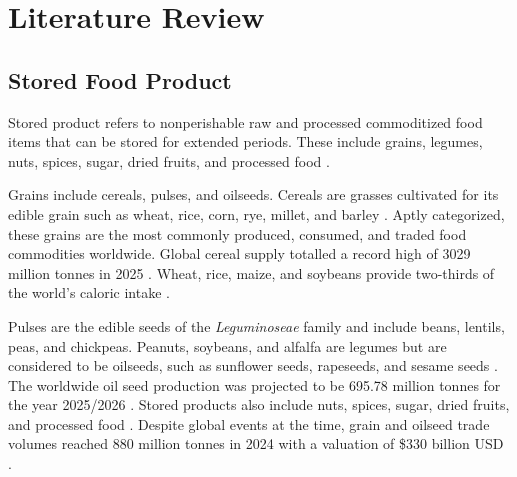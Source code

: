 \documentclass[../Vibro-Acoustic Signatures and Detection Algorithms for Stored Product Insects.tex]{subfiles}
\begin{document}
\chapter{Literature Review}


\section{Stored Food Product}

Stored product refers to nonperishable raw and processed commoditized food items that can be stored for extended periods. These include grains, legumes, nuts, spices, sugar, dried fruits, and processed food \cite{neethirajanDetectionTechniquesStoredProduct2007}.

Grains include cereals, pulses, and oilseeds. Cereals are grasses cultivated for its edible grain such as wheat, rice, corn, rye, millet, and barley \cite{awikaMajorCerealGrains2011}. Aptly categorized, these grains are the most commonly produced, consumed, and traded food commodities worldwide. Global cereal supply totalled a record high of 3029 million tonnes in 2025 \cite{FAOCerealSupply}. Wheat, rice, maize, and soybeans provide two-thirds of the world's caloric intake \cite{zhaoTemperatureIncreaseReduces2017}.

Pulses are the edible seeds of the \textit{Leguminoseae} family and include beans, lentils, peas, and chickpeas. Peanuts, soybeans, and alfalfa are legumes but are considered to be oilseeds, such as sunflower seeds, rapeseeds, and sesame seeds \cite{sathiyaseelanMajorInsectPests2022}. The worldwide oil seed production was projected to be 695.78 million tonnes for the year 2025/2026 \cite{WorldAgriculturalSupply2025}. Stored products also include nuts, spices, sugar, dried fruits, and processed food \cite{neethirajanDetectionTechniquesStoredProduct2007}. Despite global events at the time, grain and oilseed trade volumes reached 880 million tonnes in 2024 with a valuation of \$330 billion USD \cite{GrainsOilseedsWorld}.
\end{document}
